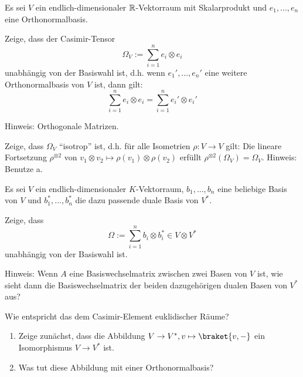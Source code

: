 
\begin{sheet}

\begin{problem}[title={Casimir-Elemente von euklidischen Räumen}]\label{tensoren:ex:casimir_wohldef}
Es sei $V$ ein endlich-dimensionaler $\mathbb{R}$-Vektorraum mit Skalarprodukt und $e_1, ..., e_n$ eine Orthonormalbasis.

\begin{subproblem}
Zeige, dass der Casimir-Tensor
\[\Omega_V := \sum_{i=1}^n e_i\otimes e_i\]
unabhängig von der Basiswahl ist, d.h. wenn $e_1', ..., e_n'$ eine weitere Orthonormalbasis von $V$ ist, dann gilt:
\[\sum_{i=1}^n e_i\otimes e_i = \sum_{i=1}^n e_i'\otimes e_i'\]

Hinweis: Orthogonale Matrizen.
\end{subproblem}

\begin{subproblem}
Zeige, dass $\Omega_V$ \enquote{isotrop} ist, d.h. für alle Isometrien $\rho: V\to V$ gilt: Die lineare Fortsetzung $\rho^{\otimes 2}$ von $v_1\otimes v_2 \mapsto \rho(v_1)\otimes\rho(v_2)$ erfüllt $\rho^{\otimes 2}(\Omega_V)=\Omega_V$.
Hinweis: Benutze a.
\end{subproblem}
\end{problem}

\begin{problem}[title={Casimir-Elemente allgemein}]
Es sei $V$ ein endlich-dimensionaler $K$-Vektorraum, $b_1, ..., b_n$ eine beliebige Basis von $V$ und $b_1^\ast, ..., b_n^\ast$ die dazu passende duale Basis von $V^\ast$.

\begin{subproblem}
Zeige, dass
\[\Omega := \sum_{i=1}^n b_i \otimes b_i^\ast \in V\otimes V^\ast\]
unabhängig von der Basiswahl ist.

Hinweis: Wenn $A$ eine Basiswechselmatrix zwischen zwei Basen von $V$ ist, wie sieht dann die Basiswechselmatrix der beiden dazugehörigen dualen Basen von $V^\ast$ aus?
\end{subproblem}
\begin{subproblem}
Wie entspricht das dem Casimir-Element euklidischer Räume?
\begin{enumerate}[label=\roman*.)]
\item Zeige zunächst, dass die Abbildung $V\to V^\ast, v\mapsto \braket{v,-}$ ein Isomorphismus $V\to V^\ast$ ist.
\item Was tut diese Abbildung mit einer Orthonormalbasis?
\end{enumerate}
\end{subproblem}
\end{problem}


\end{sheet}
